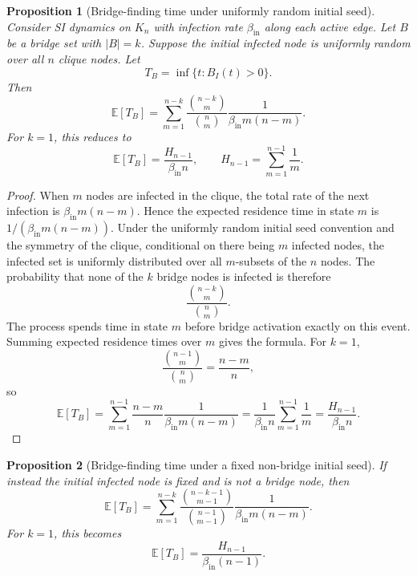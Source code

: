 \documentclass[12pt,a4paper]{article}
\newtheorem{proposition}{Proposition}
\theoremstyle{definition}
\newcommand{\E}{\mathbb{E}}
\newcommand{\1}{\mathbf{1}}
\begin{document}
\begin{proposition}[Bridge-finding time under uniformly random initial seed]
Consider SI dynamics on $K_n$ with infection rate $\beta_{\mathrm{in}}$ along each active edge.  Let $B$ be a bridge set with $|B|=k$.  Suppose the initial infected node is uniformly random over all $n$ clique nodes.  Let
\begin{equation}
    T_B=\inf\{t:B_I(t)>0\}.
\end{equation}
Then
\begin{equation}
    \E[T_B]=\sum_{m=1}^{n-k}
    \frac{\binom{n-k}{m}}{\binom{n}{m}}
    \frac{1}{\beta_{\mathrm{in}}m(n-m)}.
\end{equation}
For $k=1$, this reduces to
\begin{equation}
    \E[T_B]=\frac{H_{n-1}}{\beta_{\mathrm{in}}n},
    \qquad H_{n-1}=\sum_{m=1}^{n-1}\frac{1}{m}.
\end{equation}
\end{proposition}

\begin{proof}
When $m$ nodes are infected in the clique, the total rate of the next infection is $\beta_{\mathrm{in}}m(n-m)$.  Hence the expected residence time in state $m$ is $1/(\beta_{\mathrm{in}}m(n-m))$.  Under the uniformly random initial seed convention and the symmetry of the clique, conditional on there being $m$ infected nodes, the infected set is uniformly distributed over all $m$-subsets of the $n$ nodes.  The probability that none of the $k$ bridge nodes is infected is therefore
\begin{equation}
    \frac{\binom{n-k}{m}}{\binom{n}{m}}.
\end{equation}
The process spends time in state $m$ before bridge activation exactly on this event.  Summing expected residence times over $m$ gives the formula.  For $k=1$,
\begin{equation}
    \frac{\binom{n-1}{m}}{\binom{n}{m}}=\frac{n-m}{n},
\end{equation}
so
\begin{equation}
    \E[T_B]=\sum_{m=1}^{n-1}\frac{n-m}{n}\frac{1}{\beta_{\mathrm{in}}m(n-m)}
    =\frac{1}{\beta_{\mathrm{in}}n}\sum_{m=1}^{n-1}\frac{1}{m}
    =\frac{H_{n-1}}{\beta_{\mathrm{in}}n}.
\end{equation}
\end{proof}

\begin{proposition}[Bridge-finding time under a fixed non-bridge initial seed]
If instead the initial infected node is fixed and is not a bridge node, then
\begin{equation}
    \E[T_B]=\sum_{m=1}^{n-k}
    \frac{\binom{n-k-1}{m-1}}{\binom{n-1}{m-1}}
    \frac{1}{\beta_{\mathrm{in}}m(n-m)}.
\end{equation}
For $k=1$, this becomes
\begin{equation}
    \E[T_B]=\frac{H_{n-1}}{\beta_{\mathrm{in}}(n-1)}.
\end{equation}
\end{proposition}
\end{document}
